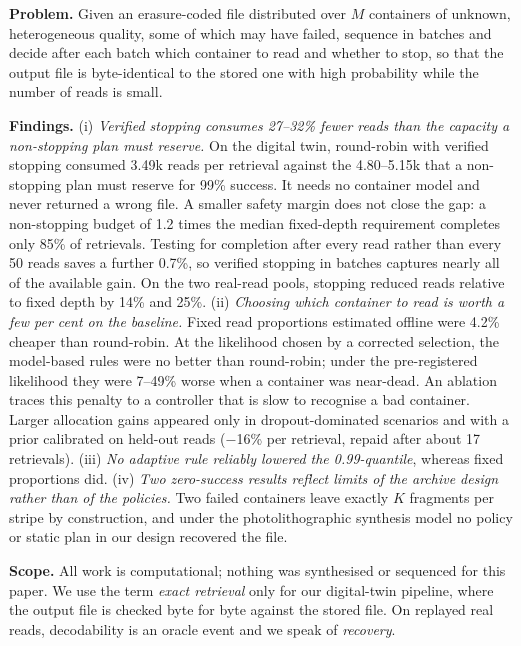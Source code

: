 \documentclass[acmsmall,screen]{acmart}
\begin{document}
\textbf{Problem.}  Given an erasure-coded file distributed over $M$ containers of unknown,
heterogeneous quality, some of which may have failed, sequence in batches and decide after
each batch which container to read and whether to stop, so that the output file is
byte-identical to the stored one with high probability while the number of reads is small.

\textbf{Findings.}  (i) \emph{Verified stopping consumes 27--32\% fewer reads than the capacity a
non-stopping plan must reserve.}  On the digital twin, round-robin with verified stopping consumed 3.49k
reads per retrieval against the 4.80--5.15k that a non-stopping plan must reserve for 99\% success.  It
needs no container model and never returned a wrong file.  A smaller safety margin does not close the
gap: a non-stopping budget of 1.2 times the median fixed-depth requirement completes only 85\%
of retrievals.  Testing for completion after every read rather than every 50 reads saves a further
0.7\%, so verified stopping in batches captures nearly all of the available gain.  On the two
real-read pools, stopping reduced reads relative to fixed depth by 14\% and 25\%.
(ii) \emph{Choosing which container to read is worth a few per cent on the baseline.}  Fixed read
proportions estimated offline were 4.2\% cheaper than round-robin.  At the likelihood chosen by a
corrected selection, the model-based rules were no better than round-robin; under the pre-registered
likelihood they were 7--49\% worse when a container was near-dead.  An ablation traces this penalty to a
controller that is slow to recognise a bad container.  Larger allocation gains appeared only in
dropout-dominated scenarios and with a prior calibrated on held-out reads ($-$16\% per retrieval, repaid
after about 17 retrievals).
(iii) \emph{No adaptive rule reliably lowered the 0.99-quantile}, whereas fixed proportions did.
(iv) \emph{Two zero-success results reflect limits of the archive design rather than of the policies.}
Two failed containers leave exactly $K$ fragments per stripe by construction, and under the
photolithographic synthesis model no policy or static plan in our design recovered the file.

\textbf{Scope.}  All work is computational; nothing was synthesised or sequenced for this paper.  We use
the term \emph{exact retrieval} only for our digital-twin pipeline, where the output file is checked
byte for byte against the stored file.  On replayed real reads, decodability is an oracle event and we
speak of \emph{recovery}.
\end{document}
